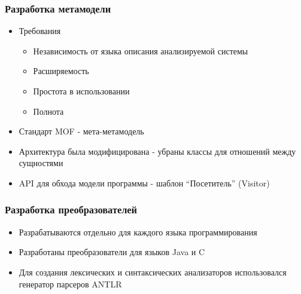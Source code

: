 \documentclass{beamer}
\begin{document}
\begin{frame}
\frametitle{Разработка метамодели}

\begin{itemize}
    \item Требования
        \begin{itemize}
            \item Независимость от языка описания анализируемой системы
            \item Расширяемость
            \item Простота в использовании
            \item Полнота
        \end{itemize}
    \item Стандарт MOF - мета-метамодель
    \item Архитектура была модифицирована - убраны классы для отношений между
    сущностями
    \item API для обхода модели программы - шаблон ``Посетитель'' (Visitor)
\end{itemize}

\end{frame}
\begin{frame}
\frametitle{Разработка преобразователей}

\begin{itemize}
    \item Разрабатываются отдельно для каждого языка программирования
    \item Разработаны преобразователи для языков Java и C
    \item Для создания лексических и синтаксических анализаторов использовался
    генератор парсеров ANTLR
\end{itemize}

\end{frame}
\end{document}

